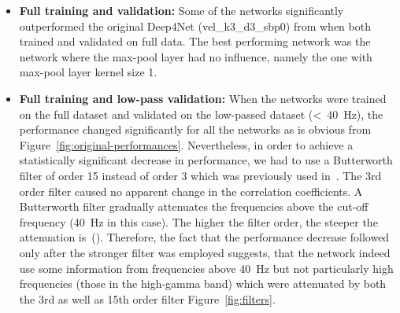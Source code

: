 \begin{itemize}
    \item \textbf{Full training and validation:} Some of the networks significantly outperformed the original Deep4Net (vel\_k3\_d3\_sbp0) from \cite{Hammer-2021} when both trained and validated on full data. The best performing network was the network where the max-pool layer had no influence, namely the one with max-pool layer kernel size 1.
    
    \item \textbf{Full training and low-pass validation:} When the networks were trained on the full dataset and validated on the low-passed dataset (<~40~Hz), the performance changed significantly for all the networks as is obvious from Figure~\ref{fig:original-performances}.
    Nevertheless, in order to achieve a statistically significant decrease in performance, we had to use a Butterworth filter of order 15 instead of order 3 which was previously used in~\cite{Hammer-2021}. The 3rd order filter caused no apparent change in the correlation coefficients.
    A Butterworth filter gradually attenuates the frequencies above the cut-off frequency (40~Hz in this case).
    The higher the filter order, the steeper the attenuation is~(\cite{butterworth1930theory}).
    Therefore, the fact that the performance decrease followed only after the stronger filter was employed suggests, that the network indeed use some information from frequencies above 40~Hz but not particularly high frequencies (those in the high-gamma band) which were attenuated by both the 3rd as well as 15th order filter Figure~\ref{fig:filters}.
    

\end{itemize}
